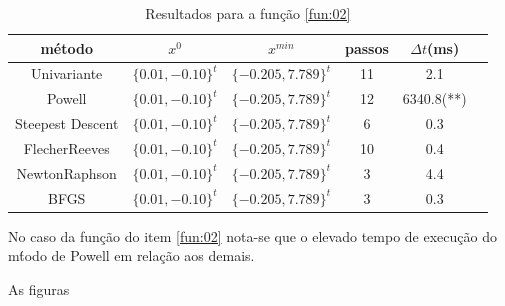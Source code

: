 \documentclass[10pt, a4paper]{article}
\begin{document}
\begin{table}[H]
      \small
      \centering
      \caption{Resultados para a fun\c c\~ao \ref{fun:02}}
      \begin{tabular}{c|c|c|c|c|c}
            m\'etodo           & $x^0$ & $x^{min}$ & passos & $\Delta t$(ms) \\
            \hline
            Univariante         & $\{0.01,-0.10\}^t$     & $\{-0.205,7.789\}^t$  & 11 & 2.1 \\
            Powell              & $\{0.01,-0.10\}^t$     & $\{-0.205,7.789\}^t$  & 12 & 6340.8(**)  \\
            Steepest Descent    & $\{0.01,-0.10\}^t$     & $\{-0.205,7.789\}^t$  &  6 & 0.3 \\
            Flecher\-Reeves     & $\{0.01,-0.10\}^t$     & $\{-0.205,7.789\}^t$  & 10 & 0.4 \\
            Newton\-Raphson     & $\{0.01,-0.10\}^t$     & $\{-0.205,7.789\}^t$  &  3 & 4.4 \\
            BFGS                & $\{0.01,-0.10\}^t$     & $\{-0.205,7.789\}^t$  &  3 & 0.3 \\
     \end{tabular}
      \label{table:resultadosf2}
\end{table}

No caso da fun\c c\~ao do item \ref{fun:02} nota-se que o elevado tempo de execu\c c\~ao do m\'todo de Powell em rela\c c\~ao aos demais.

As figuras
\end{document}
